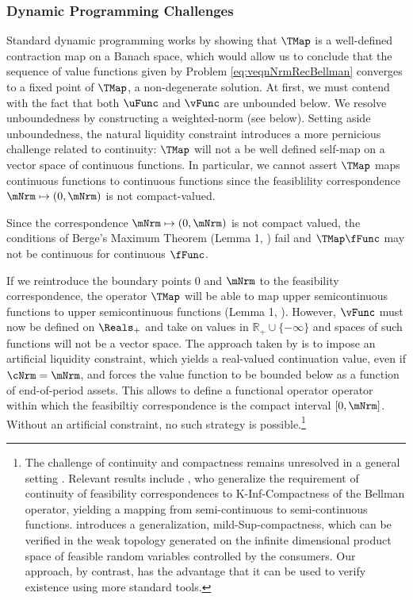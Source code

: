 \documentclass[BufferStockTheory]{subfiles}
\begin{document}
\subsubsection{Dynamic Programming Challenges}\label{subsubsec:challengesDP} \hypertarget{challengesDP}{} Standard dynamic programming \citep{stachurski2022} works by showing that $\TMap$ is a well-defined contraction map on a Banach space, which would allow us to conclude that the sequence of value functions given by Problem \ref{eq:veqnNrmRecBellman} converges to a fixed point of $\TMap$, a non-degenerate solution.
At first, we must contend with the fact that both $\uFunc$ and $\vFunc$ are unbounded below.
We resolve unboundedness by constructing a weighted-norm (see below).
Setting aside unboundedness, the natural liquidity constraint introduces a more pernicious challenge related to continuity: $\TMap$ will not a be well defined self-map on a vector space of continuous functions.
In particular, we cannot assert $\TMap$ maps continuous functions to continuous functions since the feasiblility correspondence $\mNrm\mapsto (0, \mNrm)$ is not compact-valued.

\begin{remark}\label{remark:notCompact}
Since the correspondence $\mNrm\mapsto (0, \mNrm)$ is not compact valued, the conditions of Berge's Maximum Theorem (Lemma 1, \cite{Jaskiewicz2011}) fail and $\TMap \fFunc$ may not be continuous for continuous $\fFunc$.
\end{remark}

If we reintroduce the boundary points $0$ and $\mNrm$ to the feasibility correspondence, the operator $\TMap$ will be able to map upper semicontinuous functions to upper semicontinuous functions (Lemma 1, \cite{Jaskiewicz2011}).
However, $\vFunc$ must now be defined on $\Reals_{+}$ and take on values in $\mathbb{R}_{+}\cup\{-\infty\}$ and spaces of such functions will not be a vector space.
The approach taken by \cite{Ma2022} is to impose an artificial liquidity constraint, which yields a real-valued continuation value, even if $\cNrm= \mNrm$, and forces the value function to be bounded below as a function of end-of-period assets.
This allows \cite{Ma2022} to define a functional operator operator within which the feasibiltiy correspondence is the compact interval $[0, \mNrm]$.
Without an artificial constraint, no such strategy is possible.\footnote{The challenge of continuity and compactness remains unresolved in a general setting \citep{rinconZapatero2024}.
Relevant results include \cite{Feinberg2012}, who generalize the requirement of continuity of feasibility correspondences to K-Inf-Compactness of the Bellman operator, yielding a mapping from semi-continuous to semi-continuous functions.
\cite{Shanker2017a} introduces a generalization, mild-Sup-compactness, which can be verified in the weak topology generated on the infinite dimensional product space of feasible random variables controlled by the consumers.
Our approach, by contrast, has the advantage that it can be used to verify existence using more standard tools.} 
\end{document}

